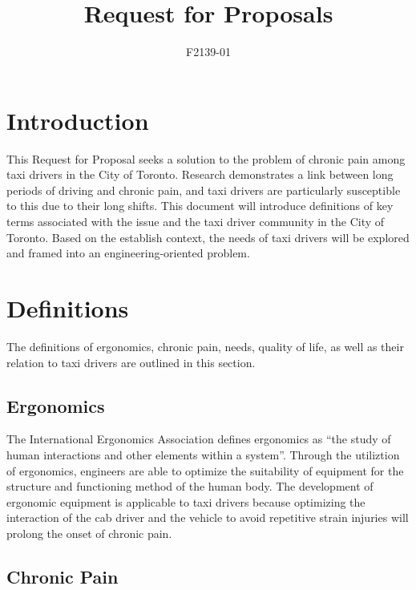 \documentclass[11pt]{article}
\begin{document}
\title{Request for Proposals}
\author{F2139-01}
\maketitle
\begin{abstract}

\end{abstract}
\section{Introduction}
\label{sec:intro}
This Request for Proposal seeks a solution to the problem of chronic
pain among taxi drivers in the City of Toronto. Research demonstrates a
link between long periods of driving and chronic pain\cite{KneePain,
Okunribido2008}, and taxi drivers are particularly susceptible to this
due to their long shifts\cite{thestar2012, KneePain}. This document will introduce
definitions of key terms associated with the issue and the taxi driver community
in the City of Toronto. Based on the establish context, the needs of taxi drivers
will be explored and framed into an engineering-oriented problem. 

\section{Definitions}
\label{sec:defs}
The definitions of ergonomics, chronic pain, needs, quality of life, as
well as their relation to taxi drivers are outlined in this section.

\subsection{Ergonomics}
\label{sec:ergonomics}

The International Ergonomics Association defines ergonomics as “the
study of human interactions and other elements within a system”\cite{ergo}. 
Through the utiliztion of ergonomics, engineers are able to optimize the suitability
of equipment for the structure and functioning method of the human
body. The development of ergonomic equipment is applicable to
taxi drivers because optimizing the interaction of the cab driver
and the vehicle to avoid repetitive strain injuries will prolong
the onset of chronic pain. 

\subsection{Chronic Pain}
\label{sec:pain}
\end{document}
